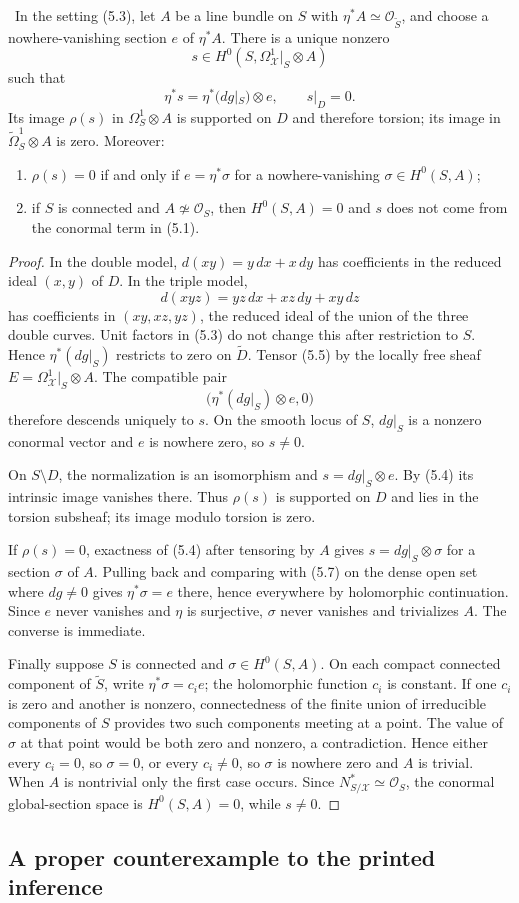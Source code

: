\begin{theorem}
\label{prop:conductor}
\Verified\ In the setting (5.3), let $A$ be a line bundle on $S$ with
$\eta^*A\simeq\mathcal O_{\widetilde S}$, and choose a nowhere-vanishing
section $e$ of $\eta^*A$.  There is a unique nonzero
\[
s\in H^0(S,\Omega^1_{\mathcal X}|_S\otimes A)
\tag{5.6}
\]
such that
\[
\eta^*s=\eta^*(dg|_S)\otimes e,\qquad s|_D=0.
\tag{5.7}
\]
Its image $\rho(s)$ in $\Omega^1_S\otimes A$ is supported on $D$ and
therefore torsion; its image in
$\widetilde\Omega^1_S\otimes A$ is zero.  Moreover:
\begin{enumerate}[label=(\alph*)]
\item $\rho(s)=0$ if and only if $e=\eta^*\sigma$ for a nowhere-vanishing
$\sigma\in H^0(S,A)$;
\item if $S$ is connected and $A\not\simeq\mathcal O_S$, then
$H^0(S,A)=0$ and $s$ does not come from the conormal term in (5.1).
\end{enumerate}
\end{theorem}

\begin{proof}
In the double model, $d(xy)=y\,dx+x\,dy$ has coefficients in the reduced
ideal $(x,y)$ of $D$.  In the triple model,
\[
d(xyz)=yz\,dx+xz\,dy+xy\,dz
\]
has coefficients in $(xy,xz,yz)$, the reduced ideal of the union of the
three double curves.  Unit factors in (5.3) do not change this after
restriction to $S$.  Hence $\eta^*(dg|_S)$ restricts to zero on
$\widetilde D$.  Tensor (5.5) by the locally free sheaf
$E=\Omega^1_{\mathcal X}|_S\otimes A$.  The compatible pair
\[
\bigl(\eta^*(dg|_S)\otimes e,0\bigr)
\]
therefore descends uniquely to $s$.  On the smooth locus of $S$, $dg|_S$
is a nonzero conormal vector and $e$ is nowhere zero, so $s\ne0$.

On $S\setminus D$, the normalization is an isomorphism and
$s=dg|_S\otimes e$.  By (5.4) its intrinsic image vanishes there.  Thus
$\rho(s)$ is supported on $D$ and lies in the torsion subsheaf; its image
modulo torsion is zero.

If $\rho(s)=0$, exactness of (5.4) after tensoring by $A$ gives
$s=dg|_S\otimes\sigma$ for a section $\sigma$ of $A$.  Pulling back and
comparing with (5.7) on the dense open set where $dg\ne0$ gives
$\eta^*\sigma=e$ there, hence everywhere by holomorphic continuation.
Since $e$ never vanishes and $\eta$ is surjective, $\sigma$ never vanishes
and trivializes $A$.  The converse is immediate.

Finally suppose $S$ is connected and $\sigma\in H^0(S,A)$.  On each compact
connected component of $\widetilde S$, write
$\eta^*\sigma=c_i e$; the holomorphic function $c_i$ is constant.  If one
$c_i$ is zero and another is nonzero, connectedness of the finite union of
irreducible components of $S$ provides two such components meeting at a
point.  The value of $\sigma$ at that point would be both zero and nonzero,
a contradiction.  Hence either every $c_i=0$, so $\sigma=0$, or every
$c_i\ne0$, so $\sigma$ is nowhere zero and $A$ is trivial.  When $A$ is
nontrivial only the first case occurs.  Since
$N^*_{S/\mathcal X}\simeq\mathcal O_S$, the conormal global-section space is
$H^0(S,A)=0$, while $s\ne0$.
\end{proof}

\subsection{A proper counterexample to the printed inference}

